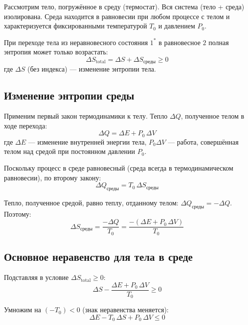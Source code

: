 \documentclass[../general/general]{subfiles}
\begin{document}
Рассмотрим тело, погружённое в среду (термостат). Вся система (тело + среда) изолирована. Среда находится в равновесии при любом процессе с телом и характеризуется фиксированными температурой $T_0$ и давлением $P_0$.

При переходе тела из неравновесного состояния $1^*$ в равновесное $2$ полная энтропия может только возрастать:
\begin{equation}
    \Delta S_{\text{total}} = \Delta S + \Delta S_{\text{среды}} \geq 0
\end{equation}
где $\Delta S$ (без индекса) --- изменение энтропии тела.

\subsection{Изменение энтропии среды}

Применим первый закон термодинамики к телу. Тепло $\Delta Q$, полученное телом в ходе перехода:
\begin{equation}
    \Delta Q = \Delta E + P_0\,\Delta V
\end{equation}
где $\Delta E$ --- изменение внутренней энергии тела, $P_0 \Delta V$ --- работа, совершённая телом над средой при постоянном давлении $P_0$.

Поскольку процесс в среде равновесный (среда всегда в термодинамическом равновесии), по второму закону:
\begin{equation}
    \Delta Q_{\text{среды}} = T_0\,\Delta S_{\text{среды}}
\end{equation}

Тепло, полученное средой, равно теплу, отданному телом: $\Delta Q_{\text{среды}} = -\Delta Q$. Поэтому:
\begin{equation}
    \Delta S_{\text{среды}} = \frac{-\Delta Q}{T_0} = \frac{-(\Delta E + P_0\,\Delta V)}{T_0}
\end{equation}

\subsection{Основное неравенство для тела в среде}

Подставляя в условие $\Delta S_{\text{total}} \geq 0$:
\begin{equation}
    \Delta S - \frac{\Delta E + P_0\,\Delta V}{T_0} \geq 0
\end{equation}

Умножим на $(-T_0) < 0$ (знак неравенства меняется):
\begin{equation}
    \boxed{\Delta E - T_0\,\Delta S + P_0\,\Delta V \leq 0}
    \label{eq:main_ineq}
\end{equation}
\end{document}

